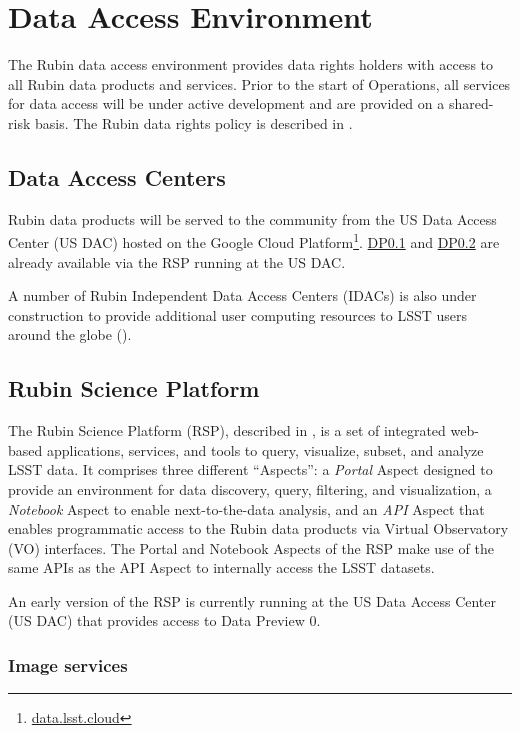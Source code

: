 \section{Data Access Environment} \label{access}

The Rubin data access environment provides data rights holders with access to all Rubin data products and services. 
Prior to the start of Operations, all services for data access will be under active development and are provided on a shared-risk basis. 
The Rubin data rights policy is described in .

\subsection{Data Access Centers}

Rubin data products will be served to the community from the US Data Access Center (US DAC) hosted on the Google Cloud Platform\footnote{\url{data.lsst.cloud}}.
\hyperref[sec:dp01]{DP0.1} and \hyperref[sec:dp02]{DP0.2}  are already available via the RSP running at the US DAC.

A number of Rubin Independent Data Access Centers (IDACs) is also under construction to provide additional user computing resources to LSST users around the globe ().

\subsection{Rubin Science Platform}

The Rubin Science Platform (RSP), described in , is a set of integrated web-based applications, services, and tools to query, visualize, subset, and analyze LSST data.
It comprises three different ``Aspects'': a \emph{Portal} Aspect designed to provide an environment for data discovery, query, filtering, and visualization, a \emph{Notebook} Aspect to enable next-to-the-data analysis, and an \emph{API} Aspect that enables programmatic access to the Rubin data products via Virtual Observatory (VO) interfaces.
The Portal and Notebook Aspects of the RSP make use of the same APIs as the API Aspect to internally access the LSST datasets.

An early version of the RSP is currently running at the US Data Access Center (US DAC) that provides access to Data Preview 0. 

\subsubsection{Image services}

